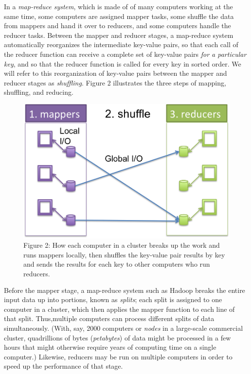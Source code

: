 \documentclass[letterpaper,10pt,openany,oneside]{sphinxmanual}
\begin{document}
In a \emph{map-reduce system}, which is made of of many computers
working at the same time, some computers are assigned mapper tasks,
some shuffle the data from mappers and hand it over to reducers,
and some computers handle the reducer tasks. Between the mapper and
reducer stages, a map-reduce system automatically reorganizes the
intermediate key-value pairs, so that each call of the reducer
function can receive a complete set of key-value pairs
\emph{for a particular key}, and so that the reducer function is called
for every key in sorted order. We will refer to this reorganization
of key-value pairs between the mapper and reducer stages as
\emph{shuffling}. Figure 2 illustrates the three steps of
mapping, shuffling, and reducing.
\begin{figure}[htbp]
\centering
\capstart

\includegraphics{Figure2.png}
\caption{Figure 2: How each computer in a cluster breaks up the work and runs
mappers locally, then shuffles the key-value pair results by key and
sends the results for each key to other computers who run reducers.}\end{figure}

Before the mapper stage, a map-reduce system such as Hadoop breaks
the entire input data up into portions, known as \emph{splits}; each
split is assigned to one computer in a cluster, which then applies
the mapper function to each line of that split. Thus,multiple
computers can process different splits of data simultaneously.
(With, say, 2000 computers or \emph{nodes} in a large-scale commercial
cluster, quadrillions of bytes (\emph{petabytes}) of data might be
processed in a few hours that might otherwise require years of
computing time on a single computer.) Likewise, reducers may be run
on multiple computers in order to speed up the performance of that
stage.
\end{document}

